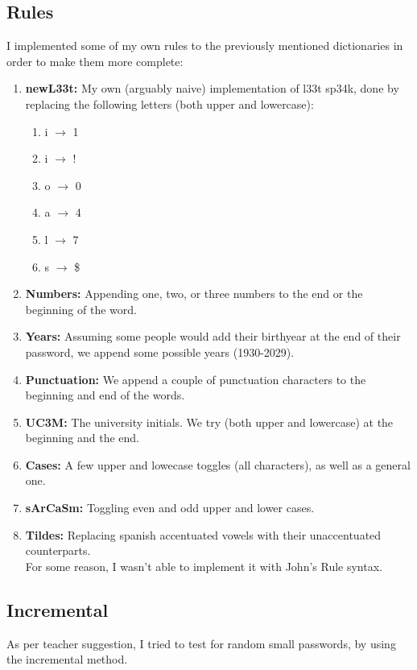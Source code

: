 \subsection{Rules}
I implemented some of my own rules to the previously mentioned dictionaries in order to make them more complete:
\begin{enumerate}
    \item \textbf{newL33t:} My own (arguably naive) implementation of l33t sp34k, done by replacing the following letters (both upper and lowercase):
    \begin{enumerate}
        \item i $\rightarrow$ 1
        \item i $\rightarrow$ !
        \item o $\rightarrow$ 0
        \item a $\rightarrow$ 4
        \item l $\rightarrow$ 7
        \item s $\rightarrow$ \$
    \end{enumerate}
    \item \textbf{Numbers:} Appending one, two, or three numbers to the end or the beginning of the word.
    \item \textbf{Years:} Assuming some people would add their birthyear at the end of their password, we append some possible years (1930-2029).
    \item \textbf{Punctuation:} We append a couple of punctuation characters to the beginning and end of the words.
    \item \textbf{UC3M:} The university initials. We try (both upper and lowercase) at the beginning and the end.
    \item \textbf{Cases:} A few upper and lowecase toggles (all characters), as well as a general one.
    \item \textbf{sArCaSm:} Toggling even and odd upper and lower cases.
    \item \textbf{Tildes:} Replacing spanish accentuated vowels with their unaccentuated counterparts.\\
    For some reason, I wasn't able to implement it with John's Rule syntax.
\end{enumerate}


\subsection{Incremental}
As per teacher suggestion, I tried to test for random small passwords, by using the incremental method.